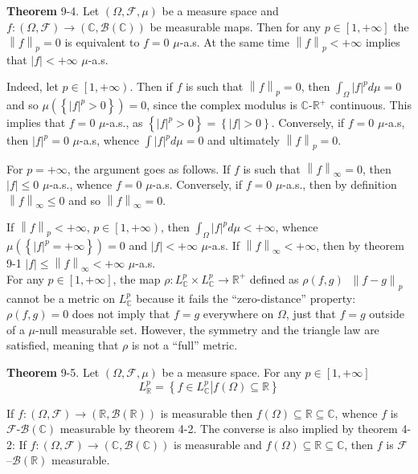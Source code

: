 \documentclass[a4paper]{article}
\newcommand{\obj}[1]{\left\{ #1 \right \}}
\newcommand{\clo}[1]{\left [ #1 \right ]}
\newcommand{\clop}[1]{\left [ #1 \right )}
\newcommand{\brac}[1]{\left ( #1 \right )}
\newcommand{\induc}[1]{\left . #1 \right \vert}
\newcommand{\abs}[1]{\left | #1 \right |}
\newcommand{\nrm}[1]{\left\| #1 \right \|}
\newcommand{\Real}{\mathbb{R}}
\newcommand{\Cplx}{\mathbb{C}}
\newcommand{\Fcal}{\mathcal{F}}
\newcommand{\borel}[1]{\mathcal{B}\brac{#1}}
\newcommand{\defn}{\mathop{\overset{\Delta}{=}}\nolimits}
\begin{document}
\label{thm:l_p_norm_muas_zero} \noindent \textbf{Theorem} 9-4.
Let $\brac{\Omega, \Fcal, \mu}$ be a measure space and $f:\brac{\Omega, \Fcal}\to\brac{\Cplx, \borel{\Cplx}}$ be measurable maps. Then for any $p\in \clo{1,+\infty}$ the $\nrm{f}_p=0$ is equivalent to $f=0$ $\mu$-a.s. At the same time $\nrm{f}_p < +\infty$ implies that $\abs{f}<+\infty$ $\mu$-a.s.

Indeed, let $p\in \clop{1,+\infty}$. Then if $f$ is such that $\nrm{f}_p = 0$, then $\int_\Omega \abs{f}^p d\mu = 0$ and so $\mu\brac{\obj{ \abs{f}^p>0 }} = 0$, since the complex modulus is $\Cplx$-$\Real^+$ continuous. This implies that $f=0$ $\mu$-a.s., as $\obj{ \abs{f}^p > 0 } = \obj{ \abs{f} > 0 }$. Conversely, if $f=0$ $\mu$-a.s, then $\abs{f}^p = 0$ $\mu$-a.s, whence $\int \abs{f}^p d\mu = 0$ and ultimately $\nrm{f}_p=0$.

For $p=+\infty$, the argument goes as follows. If $f$ is such that $\nrm{f}_\infty = 0$, then $\abs{f}\leq 0$ $\mu$-a.s., whence $f=0$ $\mu$-a.s. Conversely, if $f=0$ $\mu$-a.s., then by definition $\nrm{f}_\infty \leq 0$ and so $\nrm{f}_\infty = 0$.

If $\nrm{f}_p < +\infty$, $p\in \clop{1, +\infty}$, then $\int_\Omega \abs{f}^p d\mu < +\infty$, whence $\mu\brac{\obj{ \abs{f}^p = +\infty }} = 0$ and $\abs{f}<+\infty$ $\mu$-a.s. If $\nrm{f}_\infty < +\infty$, then by theorem 9-1 $\abs{f}\leq \nrm{f}_\infty < +\infty$ $\mu$-a.s.\\

For any $p\in \clo{1,+\infty}$, the map $\rho:L^p_\Cplx \times L^p_\Cplx \to \Real^+$ defined as $\rho\brac{f,g} \defn \nrm{f-g}_p$ cannot be a metric on $L^p_\Cplx$ because it fails the ``zero-distance'' property: $\rho\brac{f,g}=0$ does not imply that $f=g$ everywhere on $\Omega$, just that $f=g$ outside of a $\mu$-null measurable set. However, the symmetry and the triangle law are satisfied, meaning that $\rho$ is not a ``full'' metric.

\label{thm:l_p_space_nest} \noindent \textbf{Theorem} 9-5.
Let $\brac{\Omega, \Fcal, \mu}$ be a measure space. For any $p\in \clo{1, +\infty}$ \[L^p_\Real = \obj{ \induc{ f\in L^p_\Cplx } f\brac{\Omega}\subseteq \Real } \]

If $f:\brac{\Omega, \Fcal}\to\brac{\Real,\borel{\Real}}$ is measurable then $f\brac{\Omega}\subseteq \Real\subseteq \Cplx$, whence $f$ is $\Fcal$-$\borel{\Cplx}$ measurable by theorem 4-2. The converse is also implied by theorem 4-2: If $f:\brac{\Omega, \Fcal}\to\brac{\Cplx,\borel{\Cplx}}$ is measurable and $f\brac{\Omega}\subseteq \Real\subseteq \Cplx$, then $f$ is $\Fcal$--$\borel{\Real}$ measurable.
\end{document}
